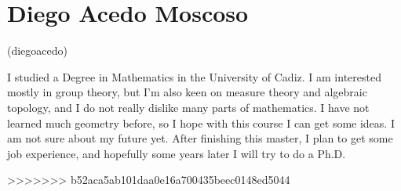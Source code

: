 \documentclass[11pt]{amsart}
\begin{document}
\section*{Diego Acedo Moscoso}
(diegoacedo)

I studied a Degree in Mathematics in the University of Cadiz. I am interested mostly in group theory, but I'm also keen on measure theory and algebraic topology, and I do not really dislike many parts of mathematics. I have not learned much geometry before, so I hope with this course I can get some ideas.
I am not sure about my future yet. After finishing this master, I plan to get some job experience, and hopefully some years later I will try to do a Ph.D.


>>>>>>> b52aca5ab101daa0e16a700435beec0148ed5044
\end{document}
